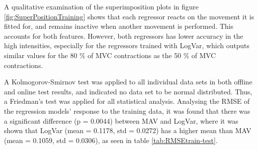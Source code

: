 \begin{multicols}{2}
	

A qualitative examination of the superimposition plots in figure \ref{fig:SuperPositionTraining} shows that each regressor reacts on the movement it is fitted for, and remains inactive when another movement is performed. This accounts for both features. However, both regressors has lower accuracy in the high intensities, especially for the regressors trained with LogVar, which outputs similar values for the 80 \% of MVC contractions as the 50 \% of MVC contractions.
	

	\begin{center}
		 \label{tab:RMSEtrain-test}
	\end{center}
	
	A Kolmogorov-Smirnov test was applied to all individual data sets in both offline and online test results, and indicated no data set to be normal distributed. Thus, a Friedman's test was applied for all statistical analysis.
	Analysing the RMSE of the regression models' response to the training data, it was found that there was a significant difference (p = 0.0044) between MAV and LogVar, where it was shown that LogVar (mean = 0.1178, std = 0.0272) has a higher mean than MAV (mean = 0.1059, std = 0.0306), as seen in table \ref{tab:RMSEtrain-test}. 
	

\end{multicols}
